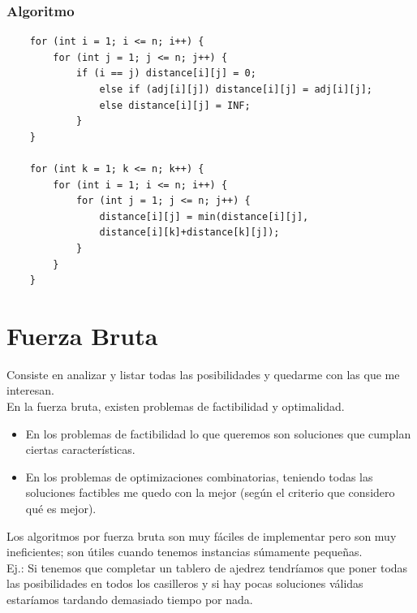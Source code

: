 \documentclass[10pt,a4paper]{article}
\begin{document}
\subsubsection*{Algoritmo}
\begin{lstlisting}
    for (int i = 1; i <= n; i++) {
        for (int j = 1; j <= n; j++) {
            if (i == j) distance[i][j] = 0;
                else if (adj[i][j]) distance[i][j] = adj[i][j];
                else distance[i][j] = INF;
            }
    }

    for (int k = 1; k <= n; k++) {
        for (int i = 1; i <= n; i++) {
            for (int j = 1; j <= n; j++) {
                distance[i][j] = min(distance[i][j],
                distance[i][k]+distance[k][j]);
            }
        }
    }
\end{lstlisting}
\section*{Fuerza Bruta}
Consiste en analizar y listar todas las posibilidades y quedarme con las que me interesan. \\
En la fuerza bruta, existen problemas de factibilidad y optimalidad. 
\begin{itemize}
    \item En los problemas de factibilidad lo que queremos son soluciones que cumplan ciertas características. 
    \item En los problemas de optimizaciones combinatorias, teniendo todas las soluciones factibles me quedo con la mejor (según el criterio que considero qué es mejor). 
\end{itemize}
Los algoritmos por fuerza bruta son muy fáciles de implementar pero son muy ineficientes; son útiles cuando tenemos instancias súmamente pequeñas. \\
Ej.: Si tenemos que completar un tablero de ajedrez tendríamos que poner todas las posibilidades en todos los casilleros y si hay pocas soluciones válidas estaríamos tardando demasiado tiempo por nada.
\end{document}
